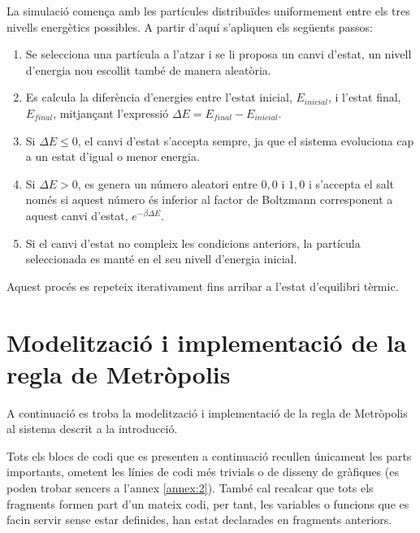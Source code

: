 \documentclass[a4paper,10.5pt]{report}
\begin{document}
La simulació comença amb les partícules distribuïdes uniformement entre els tres nivells energètics possibles. A partir d'aquí s'apliquen els següents passos:  

\begin{enumerate}
	\item Se selecciona una partícula a l'atzar i se li proposa un canvi d'estat, un nivell d'energia nou escollit també de manera aleatòria.
	
	\item Es calcula la diferència d'energies entre l'estat inicial, $E_{inicial}$, i l'estat final, $E_{final}$, mitjançant l'expressió $\Delta E = E_{final} - E_{inicial}$.
	
	\item Si $\Delta E \leq 0$, el canvi d'estat s'accepta sempre, ja que el sistema evoluciona cap a un estat d'igual o menor energia.
	
	\item Si $\Delta E > 0$, es genera un número aleatori entre $0,0$ i $1,0$ i s'accepta el salt només si aquest número és inferior al factor de Boltzmann corresponent a aquest canvi d'estat, $e^{-\beta \Delta E}$.
	
	\item Si el canvi d'estat no compleix les condicions anteriors, la partícula seleccionada es manté en el seu nivell d'energia inicial.
\end{enumerate}
 
Aquest procés es repeteix iterativament fins arribar a l'estat d'equilibri tèrmic.  

\section{Modelització i implementació de la regla de Metròpolis}

A continuació es troba la modelització i implementació de la regla de Metròpolis al sistema descrit a la introducció. 

Tots els blocs de codi que es presenten a continuació recullen únicament les parts importants, ometent les línies de codi més trivials o de disseny de gràfiques (es poden trobar sencers a l'annex \ref{annex:2}). També cal recalcar que tots els fragments formen part d'un mateix codi, per tant, les variables o funcions que es facin servir sense estar definides, han estat declarades en fragments anteriors.
\end{document}

